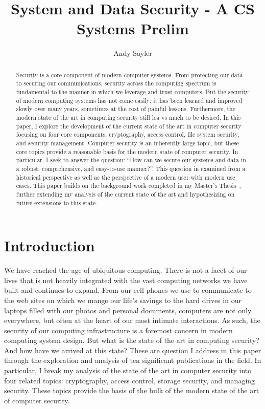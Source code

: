 \documentclass{sig-alternate}
\begin{document}
\title{System and Data Security - A CS Systems Prelim}

\author{
  \alignauthor
  Andy Sayler\\
}

\maketitle

\begin{abstract}
Security is a core component of modern computer systems. From
protecting our data to securing our communications, security across
the computing spectrum is fundamental to the manner in which we
leverage and trust computers. But the security of modern computing
systems has not come easily: it has been learned and improved slowly
over many years, sometimes at the cost of painful
lessons. Furthermore, the modern state of the art in computing
security still lea vs much to be desired. In this paper, I explore the
development of the current state of the art in computer security
focusing on four core components: cryptography, access control, file
system security, and security management. Computer security is an
inherently large topic, but these core topics provide a reasonable
basis for the modern state of computer security. In particular, I seek
to answer the question: ``How can we secure our systems and data in a
robust, comprehensive, and easy-to-use manner?''. This question in
examined from a historical perspective as well as the perspective of a
modern user with modern use cases. This paper builds on the background
work completed in my Master's Thesis~\cite{custos-masters}, further
extending my analysis of the current state of the art and
hypothesizing on future extensions to this state.
\end{abstract}

\section{Introduction}
\label{sec:intro}

We have reached the age of ubiquitous computing. There is not a facet
of our lives that is not heavily integrated with the vast computing
networks we have built and continues to expand. From our cell phones
we use to communicate to the web sites on which we mange our life's
savings to the hard drives in our laptops filled with our photos and
personal documents, computers are not only everywhere, but often at
the heart of our most intimate interactions. As such, the security of
our computing infrastructure is a foremost concern in modern computing
system design. But what is the state of the art in computing security?
And how have we arrived at this state? These are question I address in
this paper through the exploration and analysis of ten significant
publications in the field. In particular, I break my analysis of the
state of the art in computer security into four related topics:
cryptography, access control, storage security, and managing
security. These topics provide the basis of the bulk of the modern
state of the art of computer security.
\end{document}
